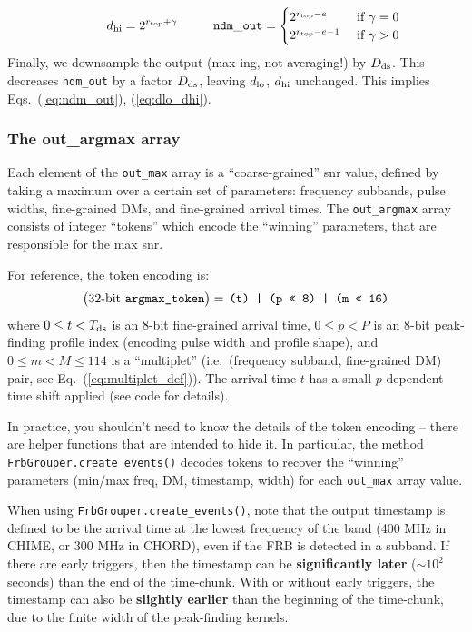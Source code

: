 \documentclass{article}
\numberwithin{equation}{section}   %
\begin{document}
\begin{itemize}
\begin{equation}
     \hspace{1cm}
   d_{\rm hi} = 2^{r_{\rm top} + \gamma}
     \hspace{1cm}
   {\tt ndm\_out} = \begin{cases}
     2^{r_{\rm top}-e} & \mbox{ if } \gamma = 0 \\
     2^{r_{\rm top}-e-1} & \mbox{ if } \gamma > 0 \\
  \end{cases}
  \end{equation}
  Finally, we downsample the output (max-ing, not averaging!) by $D_{\rm ds}$.
  This decreases {\tt ndm\_out} by a factor $D_{\rm ds}$, leaving $d_{\rm lo}$, $d_{\rm hi}$
  unchanged. This implies Eqs.\ (\ref{eq:ndm_out}), (\ref{eq:dlo_dhi}).
\end{itemize}

\subsubsection{The out\_argmax array}

Each element of the \verb|out_max| array is a ``coarse-grained'' snr value, defined by taking
a maximum over a certain set of parameters: frequency subbands, pulse widths, fine-grained DMs,
and fine-grained arrival times. The \verb|out_argmax| array consists of integer ``tokens''
which encode the ``winning'' parameters, that are responsible for the max snr.

For reference, the token encoding is:
\begin{equation}
\big(\mbox{32-bit {\tt argmax\_token}}\big)
 = \, \mbox{\tt (t) | (p << 8) | (m << 16)}
\end{equation}
where $0 \le t < T_{\rm ds}$ is an 8-bit fine-grained arrival time, $0 \le p < P$ is
an 8-bit peak-finding profile index (encoding pulse width and profile shape),
and $0 \le m < M \le 114$ is a ``multiplet''
(i.e.~(frequency subband, fine-grained DM) pair, see Eq.\ (\ref{eq:multiplet_def})).
The arrival time $t$ has a small $p$-dependent time shift applied (see code for details).

In practice, you shouldn't need to know the details of the token encoding -- there are helper
functions that are intended to hide it. In particular, the method \verb|FrbGrouper.create_events()| 
decodes tokens to recover the ``winning'' parameters (min/max freq, DM, timestamp, width) 
for each \verb|out_max| array value.

When using \verb|FrbGrouper.create_events()|, note that the output timestamp is defined to 
be the arrival time at the lowest frequency of the band (400 MHz in CHIME, or 300 MHz 
in CHORD), even if the FRB is detected in a subband.
If there are early triggers, then the timestamp can be {\bf significantly later}
($\sim 10^2$ seconds) than the end of the time-chunk.
With or without early triggers, the timestamp can also be {\bf slightly earlier}
than the beginning of the time-chunk, due to the finite width of the peak-finding
kernels.
\end{document}
